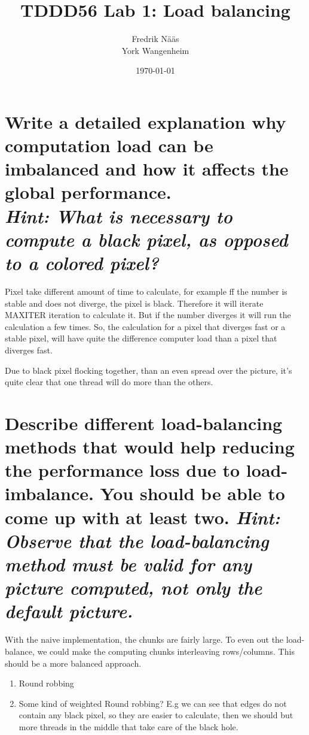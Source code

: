 \documentclass{article}
\title{TDDD56 Lab 1: Load balancing}
\author{Fredrik Nääs\\York Wangenheim}
\date{\today}
\begin{document}
\maketitle

\section{Write a detailed explanation why computation load can be imbalanced and how it affects the global performance. \\\textit{Hint: What is necessary to compute a black pixel, as opposed to a colored pixel?}}
Pixel take different amount of time to calculate, for example ff the number is stable and does not diverge,  the pixel is black. Therefore it will iterate MAXITER iteration to calculate it.  But if the number diverges it will  run the calculation a few times.
So, the calculation for a pixel that diverges fast or a stable pixel, will have quite the difference computer load than a pixel that diverges fast. 

Due to black pixel flocking together, than an even spread over the picture, it's quite clear that one thread will do more than the others. 

\section{Describe different load-balancing methods that would help reducing the performance
loss due to load-imbalance. You should be able to come up with at least two.
\textit{Hint: Observe that the load-balancing method must be valid for any picture computed, not only the default picture.}}
With the naive implementation, the chunks are fairly large. To even out the load-balance, we could make the computing chunks interleaving rows/columns. This should be a more balanced approach. 
\begin{enumerate}
    \item Round robbing
    \item Some kind of weighted Round robbing? E.g we can see that edges do not contain any black pixel, so they are easier to calculate, then we should but more threads in the middle that take care of the black hole. 
\end{enumerate}
\end{document}
